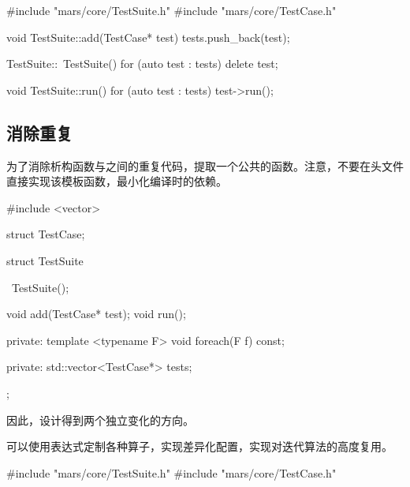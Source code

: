\begin{content}
\begin{leftbar}
 \begin{c++}[caption={\ttfamily{src/mars/core/TestSuite.cc}}]
#include "mars/core/TestSuite.h"
#include "mars/core/TestCase.h"

void TestSuite::add(TestCase* test) {
  tests.push_back(test);
}

TestSuite::~TestSuite() {
  for (auto test : tests) {
    delete test;
  }
}

void TestSuite::run() {
  for (auto test : tests) {
    test->run();
  }
}
 \end{c++}
\end{leftbar}

\subsection{消除重复}

为了消除析构函数与之间的重复代码，提取一个公共的函数。注意，不要在头文件直接实现该模板函数，最小化编译时的依赖。

\begin{leftbar}
 \begin{c++}[caption={\ttfamily{include/mars/core/TestSuite.h}}]
#include <vector>

struct TestCase;

struct TestSuite {
  ~TestSuite();

  void add(TestCase* test);
  void run();

private:
  template <typename F>
  void foreach(F f) const;

private:
  std::vector<TestCase*> tests;
};
 \end{c++}
\end{leftbar}

因此，设计得到两个独立变化的方向。

\begin{enum}
\end{enum}

可以使用表达式定制各种算子，实现差异化配置，实现对迭代算法的高度复用。

\begin{leftbar}
 \begin{c++}[caption={\ttfamily{src/mars/core/TestSuite.cc}}]
#include "mars/core/TestSuite.h"
#include "mars/core/TestCase.h"


\end{c++}
\end{leftbar}
\end{content}
